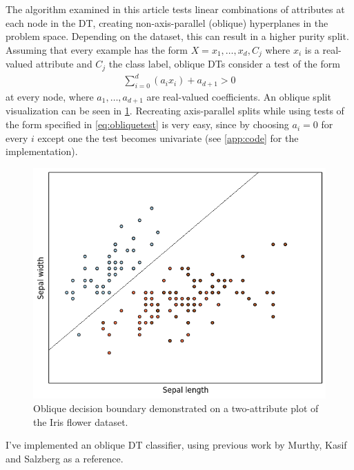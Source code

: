 \documentclass[12pt]{article}
\begin{document}
The algorithm examined in this article tests linear combinations of attributes at each node in the DT, creating non-axis-parallel (oblique) hyperplanes in the problem space. Depending on the dataset, this can result in a higher purity split. Assuming that every example has the form $X = x_1, \ldots, x_d, C_j$ where $x_i$ is a real-valued attribute and $C_j$ the class label, oblique DTs consider a test of the form
\begin{align} \label{eq:obliquetest}
\sum\limits_{i = 0}^{d} (a_i x_i) + a_{d + 1} > 0
\end{align}
at every node, where $a_1, \ldots, a_{d + 1}$ are real-valued coefficients. An oblique split visualization can be seen in \cref{fig:obliquesplit}. Recreating axis-parallel splits while using tests of the form specified in \cref{eq:obliquetest} is very easy, since by choosing $a_i = 0$ for every $i$ except one the test becomes univariate (see \cref{app:code} for the implementation).

\begin{figure}[!ht]
\centering
\includegraphics[scale=0.4]{images/sepal_length-sepal_width-withline.png}
\caption{Oblique decision boundary demonstrated on a two-attribute plot of the Iris flower dataset.}
\label{fig:obliquesplit}
\end{figure}

I've implemented an oblique DT classifier, using previous work by Murthy, Kasif and Salzberg \cite{KSM:1994} as a reference.
\end{document}
